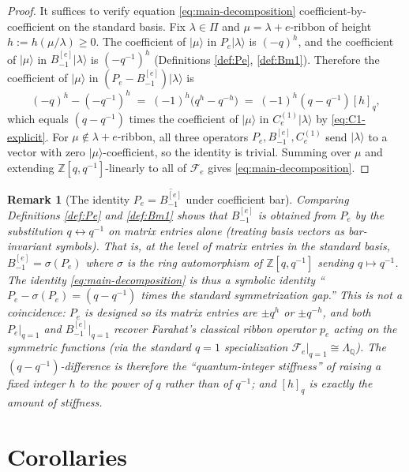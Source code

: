 \documentclass[11pt]{article}
\newtheorem{remark}[theorem]{Remark}
\theoremstyle{definition}
\newcommand{\Fock}{\mathcal{F}}
\newcommand{\Ce}{C_e^{(1)}}
\newcommand{\Bmi}{B_{-1}^{[e]}}
\begin{document}
\begin{proof}
It suffices to verify equation \eqref{eq:main-decomposition} coefficient-by-coefficient
on the standard basis. Fix $\lambda \in \Pi$ and $\mu = \lambda + e\text{-ribbon}$
of height $h := h(\mu/\lambda) \ge 0$. The coefficient of $|\mu\rangle$ in
$P_e |\lambda\rangle$ is $(-q)^h$, and the coefficient of $|\mu\rangle$ in
$\Bmi |\lambda\rangle$ is $(-q^{-1})^h$ (Definitions \ref{def:Pe}, \ref{def:Bm1}).
Therefore the coefficient of $|\mu\rangle$ in $(P_e - \Bmi) |\lambda\rangle$ is
\begin{equation}
    (-q)^h - (-q^{-1})^h \;=\; (-1)^h \bigl( q^h - q^{-h} \bigr) \;=\; (-1)^h (q - q^{-1}) [h]_q,
    \label{eq:coefficient-difference}
\end{equation}
which equals $(q - q^{-1})$ times the coefficient of $|\mu\rangle$ in
$\Ce |\lambda\rangle$ by \eqref{eq:C1-explicit}. For $\mu \notin \lambda + e\text{-ribbon}$,
all three operators $P_e, \Bmi, \Ce$ send $|\lambda\rangle$ to a vector with
zero $|\mu\rangle$-coefficient, so the identity is trivial. Summing over $\mu$
and extending $\mathbb Z[q, q^{-1}]$-linearly to all of $\Fock_e$ gives
\eqref{eq:main-decomposition}.
\end{proof}

\begin{remark}[The identity $P_e = \overline{\Bmi}$ under coefficient bar]
\label{rem:bar}
Comparing Definitions \ref{def:Pe} and \ref{def:Bm1} shows that $\Bmi$ is
obtained from $P_e$ by the substitution $q \leftrightarrow q^{-1}$ on
matrix entries alone (treating basis vectors as bar-invariant symbols). That
is, at the level of matrix entries in the standard basis, $\Bmi = \sigma(P_e)$
where $\sigma$ is the ring automorphism of $\mathbb Z[q, q^{-1}]$ sending
$q \mapsto q^{-1}$. The identity \eqref{eq:main-decomposition} is thus a
symbolic identity ``$P_e - \sigma(P_e) = (q-q^{-1})$ times the standard
symmetrization gap.'' This is not a coincidence: $P_e$ is designed so its
matrix entries are $\pm q^h$ or $\pm q^{-h}$, and both $P_e|_{q=1}$ and
$\Bmi|_{q=1}$ recover Farahat's classical ribbon operator $p_e$ acting on the
symmetric functions (via the standard $q=1$ specialization
$\Fock_e|_{q=1} \cong \Lambda_{\mathbb Q}$). The $(q - q^{-1})$-difference is
therefore the ``quantum-integer stiffness'' of raising a fixed integer $h$ to
the power of $q$ rather than of $q^{-1}$; and $[h]_q$ is exactly the amount
of stiffness.
\end{remark}

\section{Corollaries}
\label{sec:corollaries}
\end{document}
